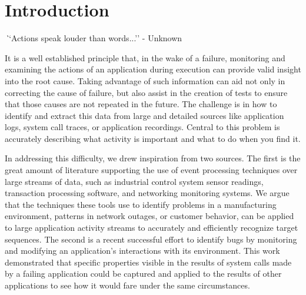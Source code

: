 \section{Introduction}
\label{SEC:introduction}


{\textit ``Actions speak louder than words...'' - Unknown}


It is a well established principle
that, in the wake of a failure,
monitoring and examining the actions
of an application
during execution can provide valid insight
into the root cause.
Taking advantage of such information
can aid not only in correcting
the cause of failure,
but also assist in the creation
of tests to ensure
that those causes
are not repeated in the future.
The challenge is in
how to identify and extract this data
from large and detailed sources like application logs,
system call traces,
or application recordings.
Central to this problem
is accurately describing what activity is important
and what to do when you find it.

In addressing this difficulty,
we drew inspiration from two sources.
The first is
the great amount of literature
supporting the use of event
processing techniques over large streams of data, such as
industrial control system sensor readings,
transaction processing software,
and networking monitoring systems.
We argue that the techniques these tools use
to identify problems in a manufacturing environment,
patterns in network outages,
or customer behavior,
can be applied
to large application activity streams to accurately
and efficiently recognize target sequences.
The second is a recent successful effort
to identify bugs by monitoring
and modifying an application's interactions with its environment.
This work demonstrated that specific properties
visible in the results of system calls
made by a failing application
could be captured and applied
to the results of other applications
to see how it would fare under the same circumstances.

